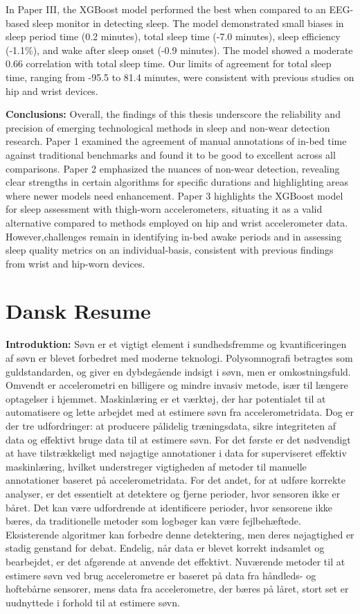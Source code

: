 \documentclass[
  10pt,
]{scrbook}
\let\originaltextbf\textbf
\renewcommand{\textbf}[1]{\textcolor{color1}{\textsf{\originaltextbf{#1}}}}
\begin{document}
In Paper III, the XGBoost model performed the best when compared to an
EEG-based sleep monitor in detecting sleep. The model demonstrated small
biases in sleep period time (0.2 minutes), total sleep time (-7.0
minutes), sleep efficiency (-1.1\%), and wake after sleep onset (-0.9
minutes). The model showed a moderate 0.66 correlation with total sleep
time. Our limits of agreement for total sleep time, ranging from -95.5
to 81.4 minutes, were consistent with previous studies on hip and wrist
devices.

\textbf{Conclusions:} Overall, the findings of this thesis underscore
the reliability and precision of emerging technological methods in sleep
and non-wear detection research. Paper 1 examined the agreement of
manual annotations of in-bed time against traditional benchmarks and
found it to be good to excellent across all comparisons. Paper 2
emphasized the nuances of non-wear detection, revealing clear strengths
in certain algorithms for specific durations and highlighting areas
where newer models need enhancement. Paper 3 highlights the XGBoost
model for sleep assessment with thigh-worn accelerometers, situating it
as a valid alternative compared to methods employed on hip and wrist
accelerometer data. However,challenges remain in identifying in-bed
awake periods and in assessing sleep quality metrics on an
individual-basis, consistent with previous findings from wrist and
hip-worn devices.

\hypertarget{dansk-resume}{%
\chapter{Dansk Resume}\label{dansk-resume}}

\textbf{Introduktion:} Søvn er et vigtigt element i sundhedsfremme og
kvantificeringen af søvn er blevet forbedret med moderne teknologi.
Polysomnografi betragtes som guldstandarden, og giver en dybdegående
indsigt i søvn, men er omkostningsfuld. Omvendt er accelerometri en
billigere og mindre invasiv metode, især til længere optagelser i
hjemmet. Maskinlæring er et værktøj, der har potentialet til at
automatisere og lette arbejdet med at estimere søvn fra
accelerometridata. Dog er der tre udfordringer: at producere pålidelig
træningsdata, sikre integriteten af data og effektivt bruge data til at
estimere søvn. For det første er det nødvendigt at have tilstrækkeligt
med nøjagtige annotationer i data for superviseret effektiv
maskinlæring, hvilket understreger vigtigheden af metoder til manuelle
annotationer baseret på accelerometridata. For det andet, for at udføre
korrekte analyser, er det essentielt at detektere og fjerne perioder,
hvor sensoren ikke er båret. Det kan være udfordrende at identificere
perioder, hvor sensorene ikke bæres, da traditionelle metoder som
logbøger kan være fejlbehæftede. Eksisterende algoritmer kan forbedre
denne detektering, men deres nøjagtighed er stadig genstand for debat.
Endelig, når data er blevet korrekt indsamlet og bearbejdet, er det
afgørende at anvende det effektivt. Nuværende metoder til at estimere
søvn ved brug accelerometre er baseret på data fra håndleds- og
hoftebårne sensorer, mens data fra accelerometre, der bæres på låret,
stort set er uudnyttede i forhold til at estimere søvn.
\end{document}
